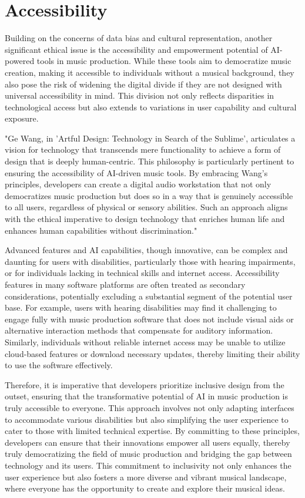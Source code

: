 \documentclass[10pt,twocolumn]{article}
\begin{document}
\section{Accessibility}

Building on the concerns of data bias and cultural representation, another significant ethical issue is the accessibility and empowerment potential of AI-powered tools in music production. While these tools aim to democratize music creation, making it accessible to individuals without a musical background, they also pose the risk of widening the digital divide if they are not designed with universal accessibility in mind. This division not only reflects disparities in technological access but also extends to variations in user capability and cultural exposure.

"Ge Wang, in 'Artful Design: Technology in Search of the Sublime'\cite{artfuldesign}, articulates a vision for technology that transcends mere functionality to achieve a form of design that is deeply human-centric. This philosophy is particularly pertinent to ensuring the accessibility of AI-driven music tools. By embracing Wang’s principles, developers can create a digital audio workstation that not only democratizes music production but does so in a way that is genuinely accessible to all users, regardless of physical or sensory abilities. Such an approach aligns with the ethical imperative to design technology that enriches human life and enhances human capabilities without discrimination."

Advanced features and AI capabilities, though innovative, can be complex and daunting for users with disabilities, particularly those with hearing impairments, or for individuals lacking in technical skills and internet access. Accessibility features in many software platforms are often treated as secondary considerations, potentially excluding a substantial segment of the potential user base. For example, users with hearing disabilities may find it challenging to engage fully with music production software that does not include visual aids or alternative interaction methods that compensate for auditory information. Similarly, individuals without reliable internet access may be unable to utilize cloud-based features or download necessary updates, thereby limiting their ability to use the software effectively.

Therefore, it is imperative that developers prioritize inclusive design from the outset, ensuring that the transformative potential of AI in music production is truly accessible to everyone. This approach involves not only adapting interfaces to accommodate various disabilities but also simplifying the user experience to cater to those with limited technical expertise. By committing to these principles, developers can ensure that their innovations empower all users equally, thereby truly democratizing the field of music production and bridging the gap between technology and its users. This commitment to inclusivity not only enhances the user experience but also fosters a more diverse and vibrant musical landscape, where everyone has the opportunity to create and explore their musical ideas.
\end{document}
